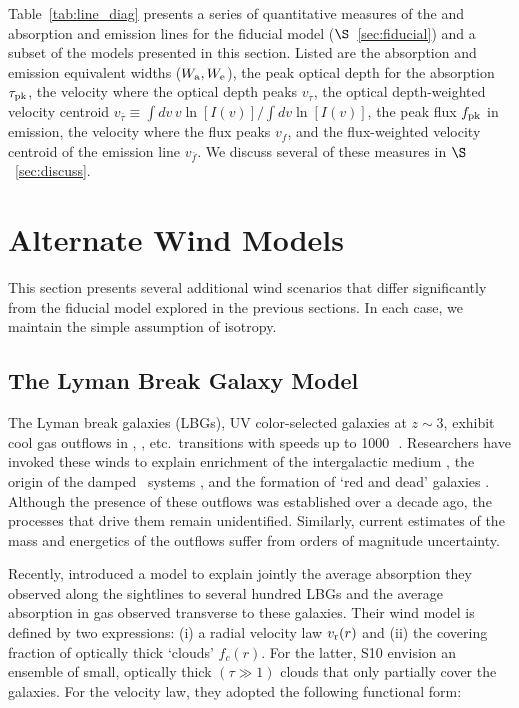 \documentclass[12pt,preprint]{aastex}
\begin{document}
Table~\ref{tab:line_diag} presents a series of quantitative measures
of the  and  absorption and emission lines for
the fiducial model ($\S$~\ref{sec:fiducial}) and a subset of the models
presented in this section.  Listed are the absorption and emission
equivalent widths ($W_{\rm a}, W_{\rm e}$), the peak optical depth
for the absorption $\tau_{\rm pk}$, the
velocity where the optical depth peaks $v_\tau$, the optical
depth-weighted velocity centroid $v_{\bar \tau} \equiv \int dv \, v
\ln[I(v)] / \int dv \ln[I(v)]$, the peak flux $f_{\rm pk}$ in
emission, the velocity where the flux peaks $v_f$, and the
flux-weighted velocity centroid of the emission line $v_{\bar f}$.
We discuss several of these measures in $\S$~\ref{sec:discuss}.


\section{Alternate Wind Models}
\label{sec:alternate}

This section presents several additional wind scenarios that differ
significantly from the fiducial model explored in the previous
sections.  In each case, we maintain the simple assumption of
isotropy.

\subsection{The Lyman Break Galaxy Model}
\label{sec:lbg}

The Lyman break galaxies (LBGs), UV color-selected galaxies at $z \sim 3$,
exhibit cool gas outflows in , ,
etc.\ transitions with speeds up to 1000\,\kms\
\citep[e.g.][]{lkg+97,pks+98}.
Researchers have invoked these winds to explain enrichment of
the intergalactic medium \citep[e.g.][]{ahs+01,spa+06}, the origin of the
damped \lya\ systems \citep{nbf98,schaye01a}, and the formation of
`red and dead' galaxies \citep[e.g.][]{spf01}.  Although the
presence of these outflows was established over a decade ago,
the processes that drive them remain
unidentified.  Similarly,  current estimates of the mass and energetics of the
outflows suffer from orders of magnitude uncertainty.

Recently, \citet[][hereafter S10]{steidel+10} introduced a model to
explain jointly the average absorption they observed
along the sightlines to several hundred LBGs and the average absorption in gas
observed transverse to these galaxies.  
Their wind model is defined by two
expressions: (i) a radial velocity law $v_{\rm r}(r)$ and (ii) the covering
fraction of optically thick `clouds' $f_c(r)$.  For the latter, S10
envision an 
ensemble of small, optically thick $(\tau \gg 1)$ clouds that only
partially cover the galaxies.
For the velocity law, they adopted the following functional
form:
\end{document}
